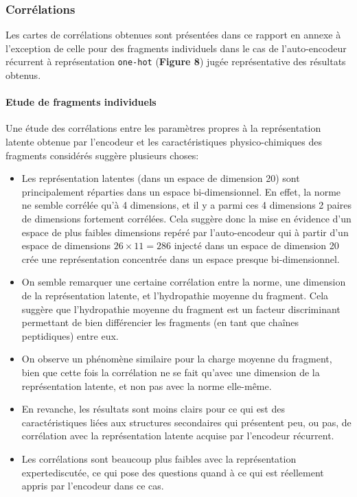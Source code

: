 \documentclass[a4paper, 11pt, onecolumn]{article}
\begin{document}
\subsubsection{Corrélations}

Les cartes de corrélations obtenues sont présentées dans ce rapport en annexe à
l'exception de celle pour des fragments individuels dans le cas de
l'auto-encodeur récurrent à représentation \texttt{one-hot} (\textbf{Figure 8}) jugée représentative des
résultats obtenus.

\paragraph{Etude de fragments individuels}

Une étude des corrélations entre les paramètres propres à la représentation
latente obtenue par l'encodeur et les caractéristiques physico-chimiques des
fragments considérés suggère plusieurs choses:
\begin{itemize}
\item Les représentation latentes (dans un espace de dimension 20) sont
  principalement réparties dans un espace bi-dimensionnel. En effet, la norme ne
  semble corrélée qu'à 4 dimensions, et il y a parmi ces 4 dimensions 2 paires
  de dimensions fortement corrélées. Cela suggère donc la mise en évidence d'un
  espace de plus faibles dimensions repéré par l'auto-encodeur qui à partir d'un espace de dimensions
  $26\times 11= 286$ injecté dans un espace de dimension 20 crée une
  représentation concentrée dans un espace presque bi-dimensionnel.
\item On semble remarquer une certaine corrélation entre la norme, une dimension
  de la représentation latente, et l'hydropathie moyenne du fragment. Cela
  suggère que l'hydropathie moyenne du fragment est un facteur discriminant
  permettant de bien différencier les fragments (en tant que chaînes
  peptidiques) entre eux.
\item On observe un phénomène similaire pour la charge moyenne du fragment, bien
  que cette fois la corrélation ne se fait qu'avec une dimension de la
  représentation latente, et non pas avec la norme elle-même.
\item En revanche, les résultats sont moins clairs pour ce qui est des
  caractéristiques liées aux structures secondaires qui présentent peu, ou pas,
  de corrélation avec la représentation latente acquise par l'encodeur
  récurrent. 
\item Les corrélations sont beaucoup plus faibles avec la représentation \og
  experte\fg discutée, ce qui pose des questions quand à ce qui est réellement
  appris par l'encodeur dans ce cas.
\end{itemize}
\end{document}
